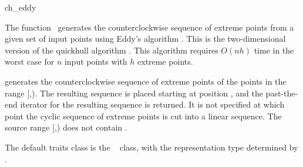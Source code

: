 
\begin{ccRefFunction}{ch_eddy}  %

\ccDefinition
  
The function \ccRefName\ generates the counterclockwise sequence of extreme
points from a given set of input points using Eddy's algorithm 
\cite{e-nchap-77}.  This is the two-dimensional version of the quickhull
algorithm \cite{bdh-qach-96}%
. 
This algorithm requires $O(n h)$ time 
in the worst case for $n$ input points with $h$ extreme points.  


            {generates the counterclockwise sequence of extreme points
            of the points in the range [,).
            The resulting sequence is placed starting at position
            , and the past-the-end iterator for the resulting
            sequence is returned. It is not specified at which point the
            cyclic sequence of extreme points is cut into a linear sequence.
            \ccPrecond %
            The source range [,) does not contain
            .}

The default traits class  is the \cgal\
 class,%
with the representation type determined by .



\end{ccRefFunction}
